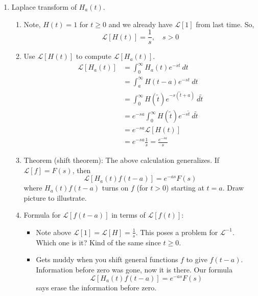 \documentclass{article}
\begin{document}
\begin{enumerate}
\item Laplace transform of $H_a(t)$.
\begin{enumerate}
\item Note, $H(t)=1$ for $t\geq 0$ and we already have $\mathcal{L}[1]$ from last time. So, 
\[
\mathcal{L}[H(t)] = \frac{1}{s}, \quad s>0
\]
\item Use $\mathcal{L}[H(t)]$ to compute $\mathcal{L}[H_a(t)]$.
\begin{align*}
\mathcal{L}[H_a(t)] 
&= \int_0^{\infty} H_a(t)e^{-st}~dt \\
&= \int_a^{\infty} H(t-a)e^{-st}~dt \\
&= \int_0^{\infty} H(\tilde{t})e^{-s(\tilde{t}+a)}~d\tilde{t} \\
&= e^{-sa}\int_0^{\infty} H(\tilde{t})e^{-s\tilde{t}}~d\tilde{t} \\
&= e^{-sa}\mathcal{L}[H(t)] \\
&= e^{-sa}\frac{1}{s} = \frac{e^{-sa}}{s}
\end{align*}
\item Theorem (shift theorem): The above calculation generalizes. If $\mathcal{L}[f]=F(s)$, then
\[
\mathcal{L}[H_a(t)f(t-a)] = e^{-as}F(s)
\]
where $H_a(t)f(t-a)$ turns on $f$ (for $t>0$) starting at $t=a$. Draw picture to illustrate.
\item Formula for $\mathcal{L}[f(t-a)]$ in terms of $\mathcal{L}[f(t)]$: 
\begin{itemize}
\item Note above $\mathcal{L}[1]=\mathcal{L}[H]=\frac{1}{s}$. This poses a problem for $\mathcal{L}^{-1}$. Which one is it? Kind of the same since $t \geq 0$. 
\item Gets muddy when you shift general functions $f$ to give $f(t-a)$. Information before zero was gone, now it is there. Our formula
\[
\mathcal{L}[H_a(t)f(t-a)] = e^{-as}F(s)
\]
says erase the information before zero.
\end{itemize}
\end{enumerate}


\end{enumerate}
\end{document}
